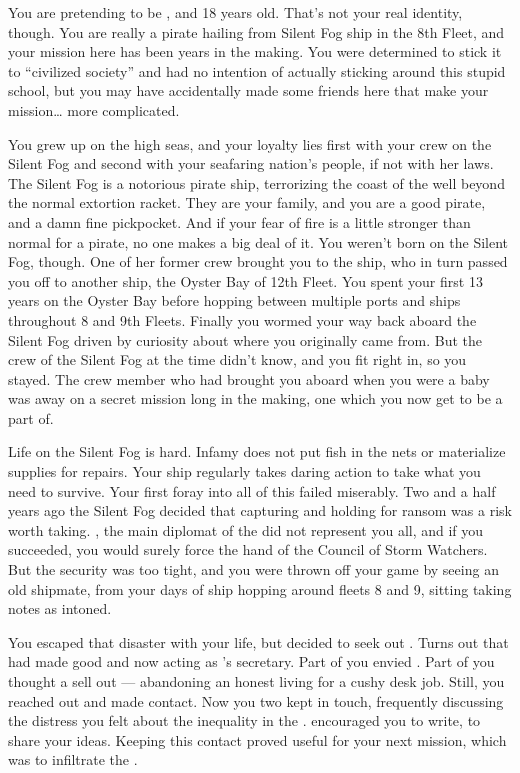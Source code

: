 \documentclass[char]{GL2020}
\begin{document}
\name{\cPirateChild{}}

You are pretending to be \cPirateChild{\intro}, and 18 years old. That's not your real identity, though. You are really a \pShippie{} pirate hailing from Silent Fog ship in the 8th Fleet, and your mission here has been years in the making. You were determined to stick it to ``civilized society'' and had no intention of actually sticking around this stupid school, but you may have accidentally made some friends here that make your mission\ldots{} more complicated.

You grew up on the high seas, and your loyalty lies first with your crew on the Silent Fog and second with your seafaring nation's people, if not with her laws. The Silent Fog is a notorious pirate ship, terrorizing the coast of the \pFarm{} well beyond the normal extortion racket. They are your family, and you are a good pirate, and a damn fine pickpocket. And if your fear of fire is a little stronger than normal for a pirate, no one makes a big deal of it. You weren't born on the Silent Fog, though. One of her former crew brought you to the ship, who in turn passed you off to another ship, the Oyster Bay of 12th Fleet. You spent your first 13 years on the Oyster Bay before hopping between multiple ports and ships throughout 8 and 9th Fleets. Finally you wormed your way back aboard the Silent Fog driven by curiosity about where you originally came from. But the crew of the Silent Fog at the time didn't know, and you fit right in, so you stayed. The crew member who had brought you aboard when you were a baby was away on a secret mission long in the making, one which you now get to be a part of.

Life on the Silent Fog is hard. Infamy does not put fish in the nets or materialize supplies for repairs. Your ship regularly takes daring action to take what you need to survive. Your first foray into all of this failed miserably. Two and a half years ago the Silent Fog decided that capturing and holding \cHeadDiplomat{\intro} for ransom was a risk worth taking. \cHeadDiplomat{}, the main diplomat of the \pShippies{} did not represent you all, and if you succeeded, you would surely force the hand of the Council of Storm Watchers. But the security was too tight, and you were thrown off your game by seeing an old shipmate, from your days of ship hopping around fleets 8 and 9, sitting taking notes as \cHeadDiplomat{} intoned. 

You escaped that disaster with your life, but decided to seek out \cChupLeader{\intro}. Turns out that \cChupLeader{\they} had made good and now \cChupLeader{\were} acting as \cHeadDiplomat{}’s secretary. Part of you envied \cChupLeader{\them}. Part of you thought \cChupLeader{\them} a sell out — abandoning an honest living for a cushy desk job. Still, you reached out and made contact. Now you two kept in touch, frequently discussing the distress you felt about the inequality in the \pShip{}. \cChupLeader{} encouraged you to write, to share your ideas. Keeping this contact proved useful for your next mission, which was to infiltrate the \pSchool{}. 
\end{document}
